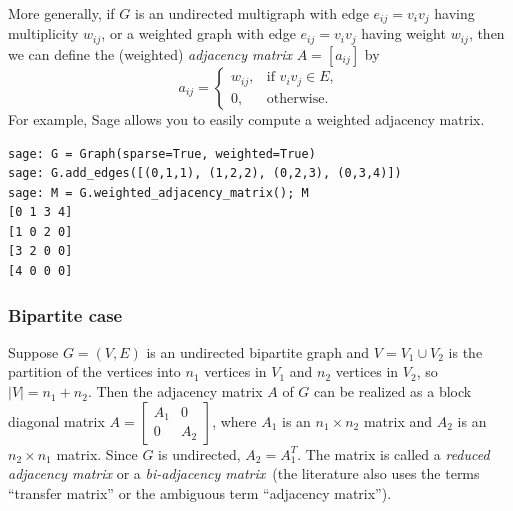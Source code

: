 
More generally, if $G$ is an undirected multigraph with edge
$e_{ij} = v_i v_j$ having multiplicity $w_{ij}$, or a weighted
graph with edge $e_{ij} = v_i v_j$ having weight $w_{ij}$, then we
can define the (weighted) \emph{adjacency matrix} $A = [a_{ij}]$ by
\[
a_{ij}
=
\begin{cases}
w_{ij}, & \text{if $v_i v_j \in E$}, \\[4pt]
0,      & \text{otherwise}.
\end{cases}
\]
For example, Sage allows you to easily compute a weighted adjacency
matrix.
\begin{lstlisting}
sage: G = Graph(sparse=True, weighted=True)
sage: G.add_edges([(0,1,1), (1,2,2), (0,2,3), (0,3,4)])
sage: M = G.weighted_adjacency_matrix(); M
[0 1 3 4]
[1 0 2 0]
[3 2 0 0]
[4 0 0 0]
\end{lstlisting}



\subsubsection{Bipartite case}

Suppose $G = (V, E)$ is an undirected bipartite graph and
$V = V_1 \cup V_2$ is the partition of the vertices into $n_1$
vertices in $V_1$ and $n_2$ vertices in $V_2$, so $|V| = n_1 + n_2$.
Then the adjacency matrix $A$ of $G$ can be realized as a block
diagonal matrix
$A
=
\begin{bmatrix}
A_1 & 0 \\
0 & A_2
\end{bmatrix}$,
where $A_1$ is an $n_1 \times n_2$ matrix and $A_2$ is an
$n_2 \times n_1$ matrix. Since $G$ is undirected, $A_2 = A_1^T$.
The matrix is called a
\emph{reduced adjacency matrix} or a
\emph{bi-adjacency matrix}~(the literature
also uses the terms ``transfer matrix'' or the ambiguous term
``adjacency matrix'').



